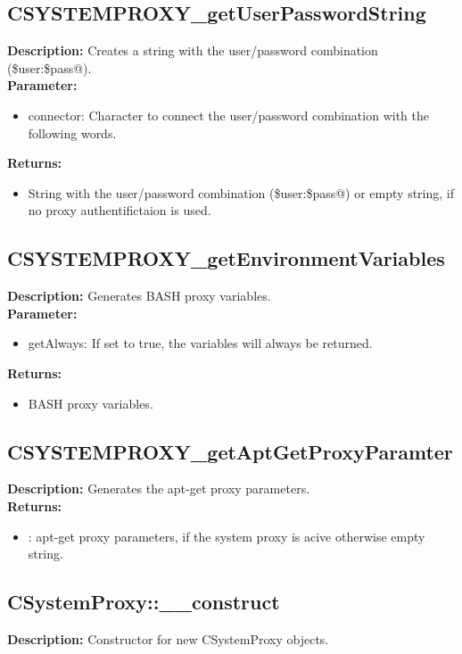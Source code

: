 \subsection{CSYSTEMPROXY\_getUserPasswordString}
\textbf{Description:} Creates a string with the user/password combination (\$user:\$pass@).\\
\textbf{Parameter:}
\begin{itemize}
\item connector: Character to connect the user/password combination with the following words.
\end{itemize}
\textbf{Returns:}
\begin{itemize}
\item String with the user/password combination (\$user:\$pass@) or empty string, if no proxy authentifictaion is used.
\end{itemize}

\subsection{CSYSTEMPROXY\_getEnvironmentVariables}
\textbf{Description:} Generates BASH proxy variables.\\
\textbf{Parameter:}
\begin{itemize}
\item getAlways: If set to true, the variables will always be returned.
\end{itemize}
\textbf{Returns:}
\begin{itemize}
\item BASH proxy variables.
\end{itemize}

\subsection{CSYSTEMPROXY\_getAptGetProxyParamter}
\textbf{Description:} Generates the apt-get proxy parameters.\\
\textbf{Returns:}
\begin{itemize}
\item : apt-get proxy parameters, if the system proxy is acive otherwise empty string.
\end{itemize}

\subsection{CSystemProxy::\_\_construct}
\textbf{Description:} Constructor for new CSystemProxy objects.\\

